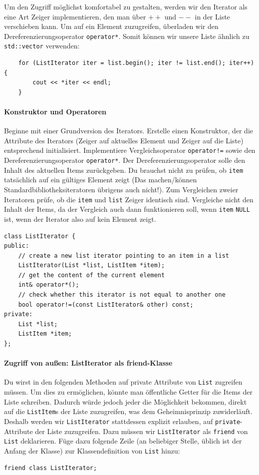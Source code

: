 Um den Zugriff möglichst komfortabel zu gestalten, werden wir den Iterator als eine Art Zeiger implementieren, den man über \textbf{$++$} und \textbf{$--$} in der Liste verschieben kann.
Um auf ein Element zuzugreifen, überladen wir den Dereferenzierungsoperator \lstinline{operator*}.
Somit können wir unsere Liste ähnlich zu \lstinline{std::vector} verwenden:
\begin{lstlisting}
	for (ListIterator iter = list.begin(); iter != list.end(); iter++) {
		cout << *iter << endl;
	}
\end{lstlisting}

\paragraph{Konstruktor und Operatoren} 
Beginne mit einer Grundversion des Iterators.
Erstelle einen Konstruktor, der die Attribute des Iterators (Zeiger auf aktuelles Element und Zeiger auf die Liste) entsprechend initialisiert.
Implementiere Vergleichsoperator \lstinline{operator!=} sowie den Dereferenzierungsoperator \lstinline{operator*}.
Der Dereferenzierungsoperator solle den Inhalt des aktuellen Items zurückgeben.
Du brauchst nicht zu prüfen, ob \lstinline{item} tatsächlich auf ein gültiges Element zeigt (Das machen/können Standardbibliotheksiteratoren übrigens auch nicht!).
Zum Vergleichen zweier Iteratoren prüfe, ob die \lstinline{item} und \lstinline{list} Zeiger identisch sind.
Vergleiche nicht den Inhalt der Items, da der Vergleich auch dann funktionieren soll, wenn \lstinline{item} \lstinline{NULL} ist, wenn der Iterator also auf kein Element zeigt.

\begin{lstlisting}
class ListIterator {
public:
	// create a new list iterator pointing to an item in a list
	ListIterator(List *list, ListItem *item);
	// get the content of the current element
	int& operator*();
	// check whether this iterator is not equal to another one
	bool operator!=(const ListIterator& other) const;
private:
	List *list;
	ListItem *item;
};
\end{lstlisting}


\paragraph{Zugriff von außen: ListIterator als friend-Klasse} Du wirst in den folgenden Methoden auf private Attribute von \lstinline{List} zugreifen müssen.
Um dies zu ermöglichen, könnte man öffentliche Getter für die Items der Liste schreiben.
Dadurch würde jedoch jeder die Möglichkeit bekommen, direkt auf die \lstinline{ListItem}s der Liste zuzugreifen, was dem Geheimnisprinzip zuwiderläuft.
Deshalb werden wir \lstinline{ListIterator} stattdessen explizit erlauben, auf \lstinline{private}-Attribute der Liste zuzugreifen.
Dazu müssen wir \lstinline{ListIterator} als \lstinline{friend} von \lstinline{List} deklarieren.
Füge dazu folgende Zeile (an beliebiger Stelle, üblich ist der Anfang der Klasse) zur Klassendefinition von \lstinline{List} hinzu:
\begin{lstlisting}
friend class ListIterator;
\end{lstlisting}

